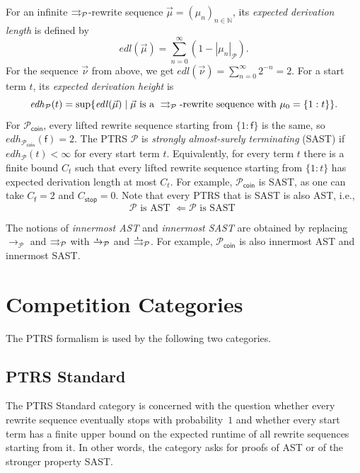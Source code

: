 For an infinite $\rightrightarrows_\mathcal{P}$-rewrite sequence $\vec{\mu} = (\mu_n)_{n \in \mathbb{N}}$, its
\emph{expected derivation length} is defined by
\[
  \mathit{edl}(\vec{\mu}) = \sum_{n=0}^{\infty} (1 - |\mu_n|_{\mathcal{P}}).
\]
For the sequence $\vec{\nu}$ from above, 
we get $\mathit{edl}(\vec{\nu}) = \sum_{n=0}^{\infty} 2^{-n} = 2$.
For a start term $t$, its \emph{expected derivation height} is
\[
  \mathit{edh}_{\mathcal{P}}(t) = \sup\{ \mathit{edl}(\vec{\mu}) \mid \vec{\mu}
  \text{ is a } \rightrightarrows_\mathcal{P}\text{-rewrite sequence with } \mu_0 = \{1:t\} \}.
\]
For $\mathcal{P}_{\mathsf{coin}}$, every lifted rewrite sequence starting from $\{1:\mathsf{f}\}$ is the same,
so $\mathit{edh}_{\mathcal{P}_{\mathsf{coin}}}(\mathsf{f}) = 2$.
The PTRS $\mathcal{P}$ is \emph{strongly almost-surely terminating} (SAST) if
$\mathit{edh}_{\mathcal{P}}(t) < \infty$ for every start term $t$.
Equivalently, for every term $t$ there is a finite bound $C_t$ such that every lifted rewrite sequence
starting from $\{1:t\}$ has expected derivation length at most $C_t$.
For example, $\mathcal{P}_{\mathsf{coin}}$ is SAST, 
as one can take $C_{\mathsf{f}} = 2$ and $C_{\mathsf{stop}} = 0$.
Note that every PTRS that is SAST is also AST, i.e., 
\[\mathcal{P} \text{ is AST } \Longleftarrow \mathcal{P} \text{ is SAST } \]

The notions of \emph{innermost AST} and \emph{innermost SAST} are obtained by replacing
$\to_\mathcal{P}$ and $\rightrightarrows_\mathcal{P}$ with $\ito_\mathcal{P}$ and $\iliftto_\mathcal{P}$.
For example, $\mathcal{P}_{\mathsf{coin}}$ is also innermost AST and innermost SAST.

\section{Competition Categories}

The PTRS formalism is used by the following two categories.

\subsection{PTRS Standard}

The PTRS Standard category is concerned with the question whether every rewrite sequence
eventually stops with probability~$1$ and whether every start term has a finite upper bound
on the expected runtime of all rewrite sequences starting from it.
In other words, the category asks for proofs of AST or of the stronger property SAST.

